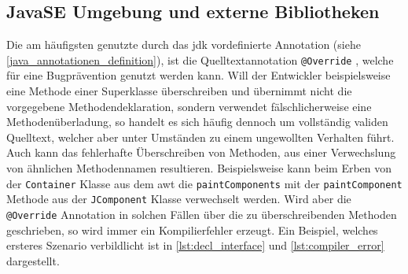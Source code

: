 \subsection{JavaSE Umgebung und externe Bibliotheken}
\label{verwendung_im_umfeld_von_java_se}
Die am häufigsten genutzte durch das \ac{jdk} vordefinierte Annotation (siehe \autoref{java_annotationen_definition}), ist die Quelltextannotation \texttt{@Override} \cite{Rocha2011}, welche für eine Bugprävention genutzt werden kann. Will der Entwickler beispielsweise eine Methode einer Superklasse überschreiben und übernimmt nicht die vorgegebene Methodendeklaration, sondern verwendet fälschlicherweise eine Methodenüberladung, so handelt es sich häufig dennoch um vollständig validen Quelltext, welcher aber unter Umständen zu einem ungewollten Verhalten führt. Auch kann das fehlerhafte Überschreiben von Methoden, aus einer Verwechslung von ähnlichen Methodennamen resultieren. Beispielsweise kann beim Erben von der \texttt{Container} Klasse aus dem \ac{awt} die \texttt{paintComponents} mit der \texttt{paintComponent} Methode aus der \texttt{JComponent} Klasse verwechselt werden. Wird aber die \texttt{@Override} Annotation in solchen Fällen über die zu überschreibenden Methoden geschrieben, so wird immer ein Kompilierfehler erzeugt. Ein Beispiel, welches ersteres Szenario verbildlicht ist in \autoref{lst:decl_interface} und \autoref{lst:compiler_error} dargestellt.

